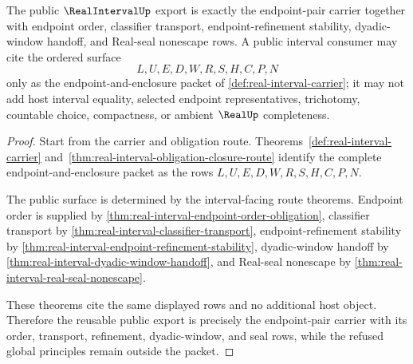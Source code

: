 \begin{theorem}
\label{thm:realinterval-public-namecert}
The public $\RealIntervalUp$ export is exactly the endpoint-pair carrier together with endpoint order, classifier transport, endpoint-refinement stability, dyadic-window handoff, and Real-seal nonescape rows. A public interval consumer may cite the ordered surface
$$
L,U,E,D,W,R,S,H,C,P,N
$$
only as the endpoint-and-enclosure packet of \autoref{def:real-interval-carrier}; it may not add host interval equality, selected endpoint representatives, trichotomy, countable choice, compactness, or ambient $\RealUp$ completeness.
\end{theorem}
\begin{proof}
Start from the carrier and obligation route. Theorems~\ref{def:real-interval-carrier} and~\ref{thm:real-interval-obligation-closure-route} identify the complete endpoint-and-enclosure packet as the rows $L,U,E,D,W,R,S,H,C,P,N$.

The public surface is determined by the interval-facing route theorems. Endpoint order is supplied by \autoref{thm:real-interval-endpoint-order-obligation}, classifier transport by \autoref{thm:real-interval-classifier-transport}, endpoint-refinement stability by \autoref{thm:real-interval-endpoint-refinement-stability}, dyadic-window handoff by \autoref{thm:real-interval-dyadic-window-handoff}, and Real-seal nonescape by \autoref{thm:real-interval-real-seal-nonescape}.

These theorems cite the same displayed rows and no additional host object. Therefore the reusable public export is precisely the endpoint-pair carrier with its order, transport, refinement, dyadic-window, and seal rows, while the refused global principles remain outside the packet.
\end{proof}

